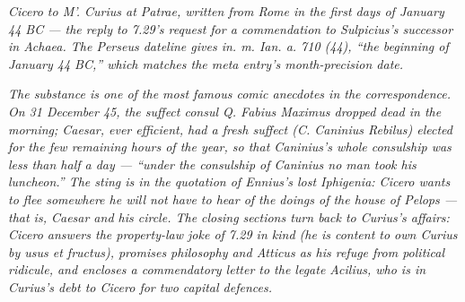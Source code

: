 
\textit{Cicero to M'. Curius at Patrae, written from Rome in the
first days of January 44 BC --- the reply to 7.29's request for a
commendation to Sulpicius's successor in Achaea. The Perseus
dateline gives \textit{in. m. Ian. a. 710 (44)}, ``the beginning of
January 44 BC,'' which matches the meta entry's month-precision
date.}

\textit{The substance is one of the most famous comic anecdotes in
the correspondence. On 31 December 45, the suffect consul Q. Fabius
Maximus dropped dead in the morning; Caesar, ever efficient, had a
fresh suffect (C. Caninius Rebilus) elected for the few remaining
hours of the year, so that Caninius's whole consulship was less than
half a day --- ``under the consulship of Caninius no man took his
luncheon.'' The sting is in the quotation of Ennius's lost
\textit{Iphigenia}: Cicero wants to flee somewhere he will not have
to hear of the doings of the house of Pelops --- that is, Caesar
and his circle. The closing sections turn back to Curius's affairs:
Cicero answers the property-law joke of 7.29 in kind (he is content
to own Curius by \textit{usus et fructus}), promises philosophy and
Atticus as his refuge from political ridicule, and encloses a
commendatory letter to the legate Acilius, who is in Curius's debt
to Cicero for two capital defences.}

